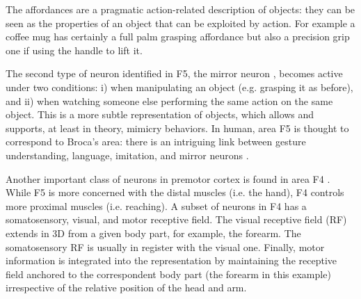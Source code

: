 \ifverbose
%
The affordances are a pragmatic action-related description of objects:
they can be seen as the properties of an object that can be exploited
by action.  For example a coffee mug has certainly a full palm
grasping affordance but also a precision grip one if using the handle
to lift it.
%
\fi

The second type of neuron identified in F5, the mirror neuron
\cite{fadiga00visuomotor}, becomes active under two conditions: i)
when manipulating an object (e.g. grasping it as before), and ii) when watching
someone else performing the same action on the same object. This is a
more subtle representation of objects, which allows and supports, at
least in theory, mimicry behaviors. In human, area F5 is thought to
correspond to Broca's area: there is an intriguing link between
gesture understanding, language, imitation, and mirror neurons
\cite{rizzolatti98language}.

\ifverbose
Another important class of neurons in premotor cortex is found in area
F4 \cite{fogassi96coding}. While F5 is more concerned with the distal
muscles (i.e. the hand), F4 controls more proximal muscles (i.e.
reaching). A subset of neurons in F4 has a somatosensory, visual, and
motor receptive field. The visual receptive field (RF) extends in 3D
from a given body part, for example, the forearm. The somatosensory RF
is usually in register with the visual one. Finally, motor information
is integrated into the representation by maintaining the receptive
field anchored to the correspondent body part (the forearm in this
example) irrespective of the relative position of the head and arm.
\fi
